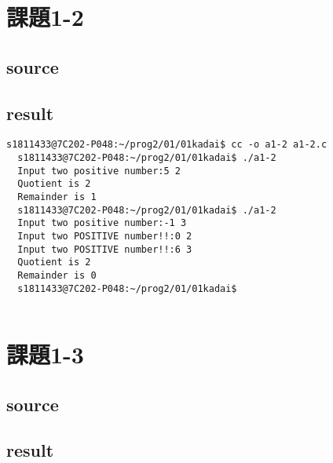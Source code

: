 \documentclass[10pt,a4paper]{jsarticle}
\begin{document}
\section{課題1-2}

\subsection{source}



\subsection{result}
\begin{lstlisting}[basicstyle=\ttfamily\footnotesize,frame=single]
  s1811433@7C202-P048:~/prog2/01/01kadai$ cc -o a1-2 a1-2.c
  s1811433@7C202-P048:~/prog2/01/01kadai$ ./a1-2
  Input two positive number:5 2
  Quotient is 2
  Remainder is 1
  s1811433@7C202-P048:~/prog2/01/01kadai$ ./a1-2
  Input two positive number:-1 3
  Input two POSITIVE number!!:0 2
  Input two POSITIVE number!!:6 3
  Quotient is 2
  Remainder is 0
  s1811433@7C202-P048:~/prog2/01/01kadai$
  
\end{lstlisting}

\section{課題1-3}
\subsection{source}


\subsection{result}
\end{document}
